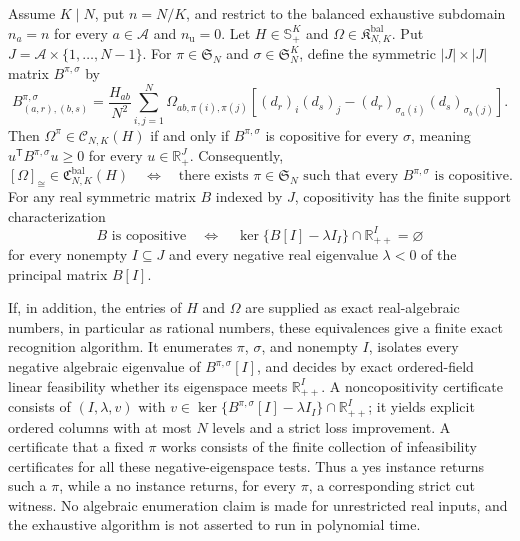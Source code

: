 Assume \(K\mid N\), put \(n=N/K\), and restrict to the balanced exhaustive subdomain \(n_a=n\) for every \(a\in\mathcal A\) and \(n_{\mathrm u}=0\). Let \(H\in\mathbb S_+^K\) and \(\Omega\in\mathfrak K^{\mathrm{bal}}_{N,K}\). Put \(J=\mathcal A\times\{1,\ldots,N-1\}\). For \(\pi\in\mathfrak S_N\) and \(\sigma\in\mathfrak S_N^K\), define the symmetric \(|J|\times|J|\) matrix \(B^{\pi,\sigma}\) by
\[
B^{\pi,\sigma}_{(a,r),(b,s)}
=\frac{H_{ab}}{N^2}\sum_{i,j=1}^N\Omega_{ab,\pi(i),\pi(j)}
\left[(d_r)_i(d_s)_j-(d_r)_{\sigma_a(i)}(d_s)_{\sigma_b(j)}\right].
\]
Then \(\Omega^\pi\in\mathcal C_{N,K}(H)\) if and only if \(B^{\pi,\sigma}\) is copositive for every \(\sigma\), meaning \(u^{\mathsf T}B^{\pi,\sigma}u\geq0\) for every \(u\in\mathbb R_+^J\). Consequently,
\[
[\Omega]_{\cong}\in\mathfrak C^{\mathrm{bal}}_{N,K}(H)
\quad\Longleftrightarrow\quad
\text{there exists }\pi\in\mathfrak S_N\text{ such that every }B^{\pi,\sigma}\text{ is copositive}.
\]
For any real symmetric matrix \(B\) indexed by \(J\), copositivity has the finite support characterization
\[
B\text{ is copositive}
\quad\Longleftrightarrow\quad
\ker\{B[I]-\lambda I_I\}\cap\mathbb R_{++}^{I}=\varnothing
\]
for every nonempty \(I\subseteq J\) and every negative real eigenvalue \(\lambda<0\) of the principal matrix \(B[I]\).

If, in addition, the entries of \(H\) and \(\Omega\) are supplied as exact real-algebraic numbers, in particular as rational numbers, these equivalences give a finite exact recognition algorithm. It enumerates \(\pi\), \(\sigma\), and nonempty \(I\), isolates every negative algebraic eigenvalue of \(B^{\pi,\sigma}[I]\), and decides by exact ordered-field linear feasibility whether its eigenspace meets \(\mathbb R_{++}^{I}\). A noncopositivity certificate consists of \((I,\lambda,v)\) with \(v\in\ker\{B^{\pi,\sigma}[I]-\lambda I_I\}\cap\mathbb R_{++}^{I}\); it yields explicit ordered columns with at most \(N\) levels and a strict loss improvement. A certificate that a fixed \(\pi\) works consists of the finite collection of infeasibility certificates for all these negative-eigenspace tests. Thus a yes instance returns such a \(\pi\), while a no instance returns, for every \(\pi\), a corresponding strict cut witness. No algebraic enumeration claim is made for unrestricted real inputs, and the exhaustive algorithm is not asserted to run in polynomial time.

